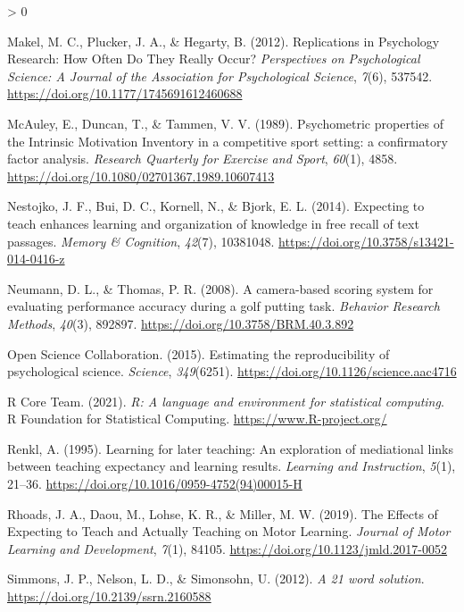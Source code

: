\documentclass[
  english,
  man,floatsintext]{apa7}
\newlength{\cslhangindent}
\newenvironment{CSLReferences}[2] %
 {%
  \setlength{\parindent}{0pt}
  \ifodd #1 \everypar{\setlength{\hangindent}{\cslhangindent}}\ignorespaces\fi
  \ifnum #2 > 0
  \setlength{\parskip}{#2\baselineskip}
  \fi
 }%
 {}
\begin{document}
\begin{CSLReferences}{1}{0}
\leavevmode\hypertarget{ref-makel2012}{}%
Makel, M. C., Plucker, J. A., \& Hegarty, B. (2012). Replications in Psychology Research: How Often Do They Really Occur? \emph{Perspectives on Psychological Science: A Journal of the Association for Psychological Science}, \emph{7}(6), 537542. \url{https://doi.org/10.1177/1745691612460688}

\leavevmode\hypertarget{ref-mcauley1989}{}%
McAuley, E., Duncan, T., \& Tammen, V. V. (1989). Psychometric properties of the Intrinsic Motivation Inventory in a competitive sport setting: a confirmatory factor analysis. \emph{Research Quarterly for Exercise and Sport}, \emph{60}(1), 4858. \url{https://doi.org/10.1080/02701367.1989.10607413}

\leavevmode\hypertarget{ref-nestojko2014}{}%
Nestojko, J. F., Bui, D. C., Kornell, N., \& Bjork, E. L. (2014). Expecting to teach enhances learning and organization of knowledge in free recall of text passages. \emph{Memory \& Cognition}, \emph{42}(7), 10381048. \url{https://doi.org/10.3758/s13421-014-0416-z}

\leavevmode\hypertarget{ref-neumann2008}{}%
Neumann, D. L., \& Thomas, P. R. (2008). A camera-based scoring system for evaluating performance accuracy during a golf putting task. \emph{Behavior Research Methods}, \emph{40}(3), 892897. \url{https://doi.org/10.3758/BRM.40.3.892}

\leavevmode\hypertarget{ref-collaboration2015}{}%
Open Science Collaboration. (2015). Estimating the reproducibility of psychological science. \emph{Science}, \emph{349}(6251). \url{https://doi.org/10.1126/science.aac4716}

\leavevmode\hypertarget{ref-R-base}{}%
R Core Team. (2021). \emph{R: A language and environment for statistical computing}. R Foundation for Statistical Computing. \url{https://www.R-project.org/}

\leavevmode\hypertarget{ref-renkl1995}{}%
Renkl, A. (1995). Learning for later teaching: An exploration of mediational links between teaching expectancy and learning results. \emph{Learning and Instruction}, \emph{5}(1), 21--36. \url{https://doi.org/10.1016/0959-4752(94)00015-H}

\leavevmode\hypertarget{ref-rhoads2019}{}%
Rhoads, J. A., Daou, M., Lohse, K. R., \& Miller, M. W. (2019). The Effects of Expecting to Teach and Actually Teaching on Motor Learning. \emph{Journal of Motor Learning and Development}, \emph{7}(1), 84105. \url{https://doi.org/10.1123/jmld.2017-0052}

\leavevmode\hypertarget{ref-simmons2012}{}%
Simmons, J. P., Nelson, L. D., \& Simonsohn, U. (2012). \emph{A 21 word solution}. \url{https://doi.org/10.2139/ssrn.2160588}


\end{CSLReferences}
\end{document}
